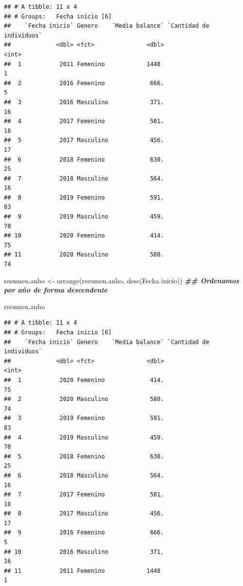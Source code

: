 \documentclass[
  12pt,
]{book}
\newenvironment{Shaded}{\begin{snugshade}}{\end{snugshade}}
\newcommand{\AttributeTok}[1]{\textcolor[rgb]{0.77,0.63,0.00}{#1}}
\newcommand{\DocumentationTok}[1]{\textcolor[rgb]{0.56,0.35,0.01}{\textbf{\textit{#1}}}}
\newcommand{\FunctionTok}[1]{\textcolor[rgb]{0.00,0.00,0.00}{#1}}
\newcommand{\NormalTok}[1]{#1}
\newcommand{\OtherTok}[1]{\textcolor[rgb]{0.56,0.35,0.01}{#1}}
\newcommand{\StringTok}[1]{\textcolor[rgb]{0.31,0.60,0.02}{#1}}
\begin{document}
\begin{verbatim}
## # A tibble: 11 x 4
## # Groups:   Fecha inicio [6]
##    `Fecha inicio` Genero    `Media balance` `Cantidad de individuos`
##             <dbl> <fct>               <dbl>                    <int>
##  1           2011 Femenino            1448                         1
##  2           2016 Femenino             666.                        5
##  3           2016 Masculino            371.                       16
##  4           2017 Femenino             501.                       18
##  5           2017 Masculino            456.                       17
##  6           2018 Femenino             630.                       25
##  7           2018 Masculino            564.                       16
##  8           2019 Femenino             591.                       83
##  9           2019 Masculino            459.                       70
## 10           2020 Femenino             414.                       75
## 11           2020 Masculino            588.                       74
\end{verbatim}

\begin{Shaded}
\begin{Highlighting}[]
\NormalTok{resumen.anho }\OtherTok{\textless{}{-}} \FunctionTok{arrange}\NormalTok{(resumen.anho, }\FunctionTok{desc}\NormalTok{(}\StringTok{\textasciigrave{}}\AttributeTok{Fecha inicio}\StringTok{\textasciigrave{}}\NormalTok{))  }\DocumentationTok{\#\# Ordenamos por año de forma descendente}

\NormalTok{resumen.anho}
\end{Highlighting}
\end{Shaded}

\begin{verbatim}
## # A tibble: 11 x 4
## # Groups:   Fecha inicio [6]
##    `Fecha inicio` Genero    `Media balance` `Cantidad de individuos`
##             <dbl> <fct>               <dbl>                    <int>
##  1           2020 Femenino             414.                       75
##  2           2020 Masculino            588.                       74
##  3           2019 Femenino             591.                       83
##  4           2019 Masculino            459.                       70
##  5           2018 Femenino             630.                       25
##  6           2018 Masculino            564.                       16
##  7           2017 Femenino             501.                       18
##  8           2017 Masculino            456.                       17
##  9           2016 Femenino             666.                        5
## 10           2016 Masculino            371.                       16
## 11           2011 Femenino            1448                         1
\end{verbatim}
\end{document}
